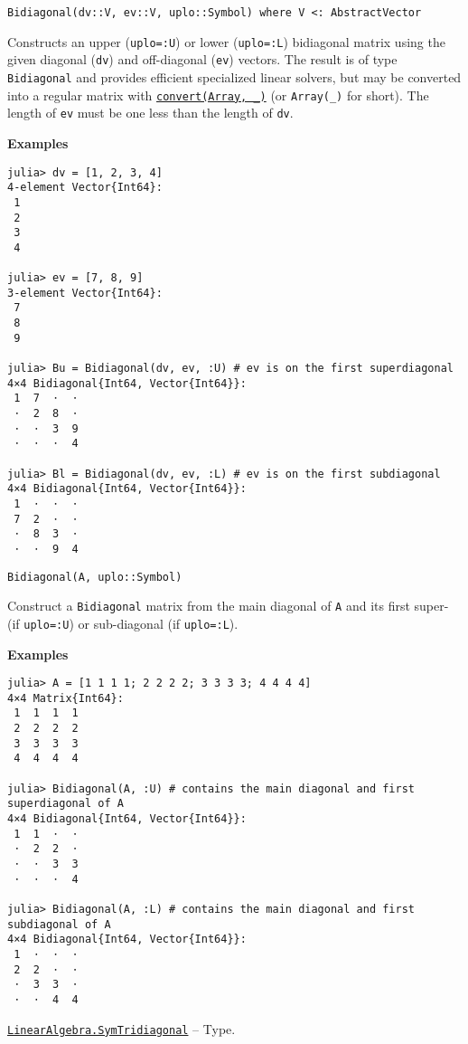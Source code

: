 \begin{adjustwidth}{2em}{0pt}


\begin{verbatim}
Bidiagonal(dv::V, ev::V, uplo::Symbol) where V <: AbstractVector
\end{verbatim}

Constructs an upper (\texttt{uplo=:U}) or lower (\texttt{uplo=:L}) bidiagonal matrix using the given diagonal (\texttt{dv}) and off-diagonal (\texttt{ev}) vectors. The result is of type \texttt{Bidiagonal} and provides efficient specialized linear solvers, but may be converted into a regular matrix with \hyperlink{1846942650946171605}{\texttt{convert(Array, \_)}} (or \texttt{Array(\_)} for short). The length of \texttt{ev} must be one less than the length of \texttt{dv}.

\textbf{Examples}


\begin{verbatim}
julia> dv = [1, 2, 3, 4]
4-element Vector{Int64}:
 1
 2
 3
 4

julia> ev = [7, 8, 9]
3-element Vector{Int64}:
 7
 8
 9

julia> Bu = Bidiagonal(dv, ev, :U) # ev is on the first superdiagonal
4×4 Bidiagonal{Int64, Vector{Int64}}:
 1  7  ⋅  ⋅
 ⋅  2  8  ⋅
 ⋅  ⋅  3  9
 ⋅  ⋅  ⋅  4

julia> Bl = Bidiagonal(dv, ev, :L) # ev is on the first subdiagonal
4×4 Bidiagonal{Int64, Vector{Int64}}:
 1  ⋅  ⋅  ⋅
 7  2  ⋅  ⋅
 ⋅  8  3  ⋅
 ⋅  ⋅  9  4
\end{verbatim}




\begin{lstlisting}
Bidiagonal(A, uplo::Symbol)
\end{lstlisting}

Construct a \texttt{Bidiagonal} matrix from the main diagonal of \texttt{A} and its first super- (if \texttt{uplo=:U}) or sub-diagonal (if \texttt{uplo=:L}).

\textbf{Examples}


\begin{verbatim}
julia> A = [1 1 1 1; 2 2 2 2; 3 3 3 3; 4 4 4 4]
4×4 Matrix{Int64}:
 1  1  1  1
 2  2  2  2
 3  3  3  3
 4  4  4  4

julia> Bidiagonal(A, :U) # contains the main diagonal and first superdiagonal of A
4×4 Bidiagonal{Int64, Vector{Int64}}:
 1  1  ⋅  ⋅
 ⋅  2  2  ⋅
 ⋅  ⋅  3  3
 ⋅  ⋅  ⋅  4

julia> Bidiagonal(A, :L) # contains the main diagonal and first subdiagonal of A
4×4 Bidiagonal{Int64, Vector{Int64}}:
 1  ⋅  ⋅  ⋅
 2  2  ⋅  ⋅
 ⋅  3  3  ⋅
 ⋅  ⋅  4  4
\end{verbatim}



\end{adjustwidth}
\hypertarget{6062797780727203318}{}
\hyperlink{6062797780727203318}{\texttt{LinearAlgebra.SymTridiagonal}}  -- {Type.}

